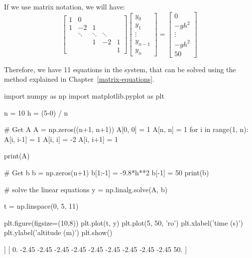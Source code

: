 If we use matrix notation, we will have:
\begin{equation*}
\begin{bmatrix}
1 & 0\\
1 & -2 & 1 \\
  &  \ddots & \ddots & \ddots & \\
  & &  1 & -2 & 1 \\
  &  &  &  & 1 
\end{bmatrix}
\begin{bmatrix}
y_0 \\
y_1 \\
\vdots \\
y_{n-1} \\
y_n 
\end{bmatrix}
=
\begin{bmatrix}
0\\
-gh^2 \\
\vdots \\
-gh^2 \\
50
\end{bmatrix}
\end{equation*}

Therefore, we have 11 equations in the system, that can be solved using the method explained in Chapter~\ref{matrix-equations}.

\begin{ipython}
import numpy as np
import matplotlib.pyplot as plt

n = 10
h = (5-0) / n

# Get A
A = np.zeros((n+1, n+1))
A[0, 0] = 1
A[n, n] = 1
for i in range(1, n):
    A[i, i-1] = 1
    A[i, i] = -2
    A[i, i+1] = 1

print(A)

# Get b
b = np.zeros(n+1)
b[1:-1] = -9.8*h**2
b[-1] = 50
print(b)

# solve the linear equations
y = np.linalg.solve(A, b)

t = np.linspace(0, 5, 11)

plt.figure(figsize=(10,8))
plt.plot(t, y)
plt.plot(5, 50, 'ro')
plt.xlabel('time (s)')
plt.ylabel('altitude (m)')
plt.show()
\end{ipython}
\begin{ioutput}
[[ 1.  0.  0.  0.  0.  0.  0.  0.  0.  0.  0.]
 [ 1. -2.  1.  0.  0.  0.  0.  0.  0.  0.  0.]
 [ 0.  1. -2.  1.  0.  0.  0.  0.  0.  0.  0.]
 [ 0.  0.  1. -2.  1.  0.  0.  0.  0.  0.  0.]
 [ 0.  0.  0.  1. -2.  1.  0.  0.  0.  0.  0.]
 [ 0.  0.  0.  0.  1. -2.  1.  0.  0.  0.  0.]
 [ 0.  0.  0.  0.  0.  1. -2.  1.  0.  0.  0.]
 [ 0.  0.  0.  0.  0.  0.  1. -2.  1.  0.  0.]
 [ 0.  0.  0.  0.  0.  0.  0.  1. -2.  1.  0.]
 [ 0.  0.  0.  0.  0.  0.  0.  0.  1. -2.  1.]
 [ 0.  0.  0.  0.  0.  0.  0.  0.  0.  0.  1.]]
[ 0.   -2.45 -2.45 -2.45 -2.45 -2.45 -2.45 -2.45 -2.45 -2.45 50.  ]
\end{ioutput}

